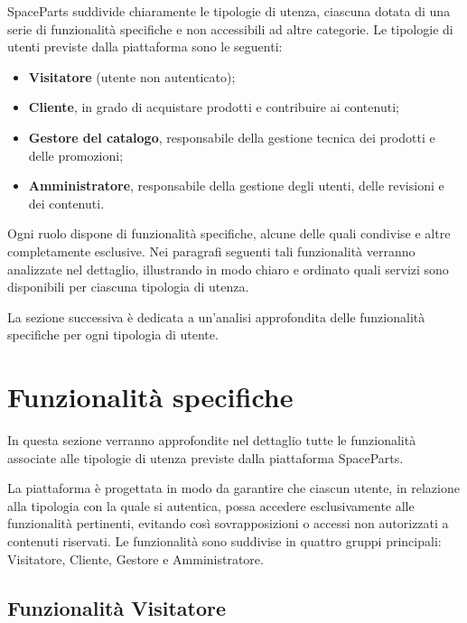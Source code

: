 \documentclass[a4paper,12pt]{report}
\begin{document}
SpaceParts suddivide chiaramente le tipologie di utenza, ciascuna dotata di una serie di funzionalità specifiche e non accessibili ad altre categorie. Le tipologie di utenti previste dalla piattaforma sono le seguenti:

\begin{itemize}
    \item \textbf{Visitatore} (utente non autenticato);
    \item \textbf{Cliente}, in grado di acquistare prodotti e contribuire ai contenuti;
    \item \textbf{Gestore del catalogo}, responsabile della gestione tecnica dei prodotti e delle promozioni;
    \item \textbf{Amministratore}, responsabile della gestione degli utenti, delle revisioni e dei contenuti.
\end{itemize}

Ogni ruolo dispone di funzionalità specifiche, alcune delle quali condivise e altre completamente esclusive. Nei paragrafi seguenti tali funzionalità verranno analizzate nel dettaglio, illustrando in modo chiaro e ordinato quali servizi sono disponibili per ciascuna tipologia di utenza.

\medskip

La sezione successiva è dedicata a un’analisi approfondita delle funzionalità specifiche per ogni tipologia di utente.

\section{Funzionalità specifiche}
\label{sec:funzionalita}

In questa sezione verranno approfondite nel dettaglio tutte le funzionalità
associate alle tipologie di utenza previste dalla piattaforma SpaceParts.

La piattaforma è progettata in modo da garantire che ciascun utente,
in relazione alla tipologia con la quale si autentica, possa accedere esclusivamente
alle funzionalità pertinenti, evitando così sovrapposizioni o accessi non autorizzati
a contenuti riservati.  
Le funzionalità sono suddivise in quattro gruppi principali:
Visitatore, Cliente, Gestore e Amministratore.


\subsection{Funzionalità Visitatore}
\label{sec:visitatore}
\end{document}
